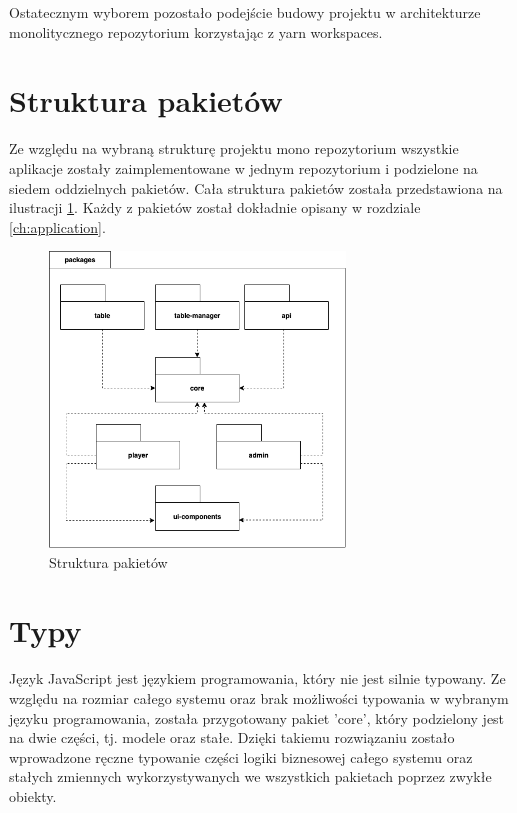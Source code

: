 Ostatecznym wyborem pozostało podejście budowy projektu w architekturze monolitycznego repozytorium korzystając z yarn workspaces.

\newpage

\section{Struktura pakietów}
Ze względu na wybraną strukturę projektu mono repozytorium wszystkie aplikacje zostały zaimplementowane w jednym repozytorium i podzielone na siedem oddzielnych pakietów. Cała struktura pakietów została przedstawiona na ilustracji \ref{fig:packages-structure}. Każdy z pakietów został dokładnie opisany w rozdziale \ref{ch:application}.

\begin{figure}[h!]
  \centering
    \includegraphics[width=0.7\textwidth]{images/diagrams/packages_structure.png}
  \caption{Struktura pakietów}
  \label{fig:packages-structure}
\end{figure}


\section{Typy}
Język JavaScript jest językiem programowania, który nie jest silnie typowany. Ze względu na rozmiar całego systemu oraz brak możliwości typowania w wybranym języku programowania, została przygotowany pakiet 'core', który podzielony jest na dwie części, tj. modele oraz stałe.
Dzięki takiemu rozwiązaniu zostało wprowadzone ręczne typowanie części logiki biznesowej całego systemu oraz stałych zmiennych wykorzystywanych we wszystkich pakietach poprzez zwykłe obiekty. 

